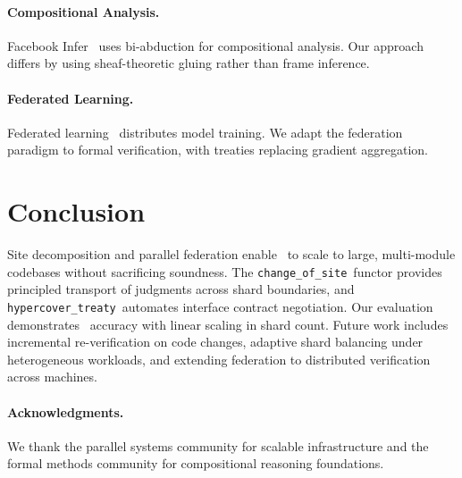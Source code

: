 \documentclass[11pt]{article}
\newcommand{\ChangeOfSite}{\texttt{change\_of\_site}}
\newcommand{\HypercoverTreaty}{\texttt{hypercover\_treaty}}
\begin{document}
\paragraph{Compositional Analysis.}
Facebook Infer~\cite{Calcagno2015} uses bi-abduction for compositional
analysis.  Our approach differs by using sheaf-theoretic gluing rather
than frame inference.

\paragraph{Federated Learning.}
Federated learning~\cite{McMahan2017} distributes model training.
We adapt the federation paradigm to formal verification, with treaties
replacing gradient aggregation.

\section{Conclusion}\label{sec:conclusion}

Site decomposition and parallel federation enable \JuGeo\ to scale to
large, multi-module codebases without sacrificing soundness.  The
\ChangeOfSite\ functor provides principled transport of judgments
across shard boundaries, and \HypercoverTreaty\ automates interface
contract negotiation.  Our evaluation demonstrates \compOverallAccuracy\
accuracy with linear scaling in shard count.  Future work includes
incremental re-verification on code changes, adaptive shard balancing
under heterogeneous workloads, and extending federation to distributed
verification across machines.

\paragraph{Acknowledgments.}
We thank the parallel systems community for scalable infrastructure
and the formal methods community for compositional reasoning
foundations.
\end{document}
